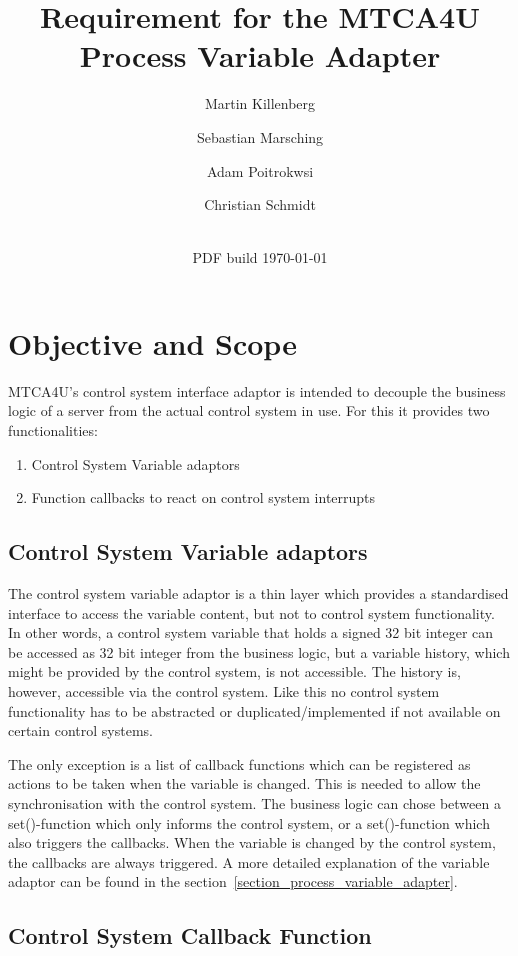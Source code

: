 \documentclass[11pt,a4paper]{scrartcl}
\title{Requirement for the MTCA4U Process Variable Adapter}
\date{\svnrevision\\ PDF build \today}
\author[1]{Martin Killenberg} \author[2]{Sebastian Marsching}
\author[3]{Adam Poitrokwsi}
\author[1]{Christian Schmidt}
\affil[1]{Deutsches Elektronen-Synchrotron DESY, Hamburg, Germany}
\affil[2]{aquenos GmbH, Baden-Baden, Germany}
\affil[3]{FastLogic Sp.\ z o.\ o., \L\'od\'z, Poland}
\begin{document}
\maketitle
\section{Objective and Scope}

MTCA4U's control system interface adaptor is intended to decouple the business logic of a server from the actual control system in use. For this it provides two functionalities:
\begin{enumerate}
  \item Control System Variable adaptors
  \item Function callbacks to react on control system interrupts
\end{enumerate}

\subsection{Control System Variable adaptors}

The control system variable adaptor is a thin layer which provides a standardised interface to access the variable content, but not to control system functionality. In other words, a control system variable that holds a signed 32 bit integer can be accessed as 32 bit integer from the business logic, but a variable history, which might be provided by the control system, is not accessible. The history is, however, accessible via the control system. Like this no control system functionality has to be abstracted or duplicated/implemented if not available on certain control systems.

The only exception is a list of callback functions which can be registered as actions to be taken when the variable is changed. This is needed to allow the synchronisation with the control system. The business logic can chose between a set()-function which only informs the control system, or a set()-function which also triggers the callbacks. When the variable is changed by the control system, the callbacks are always triggered. A more detailed explanation of the variable adaptor can be found in the section~\ref{section_process_variable_adapter}.

\subsection{Control System Callback Function}
\end{document}
